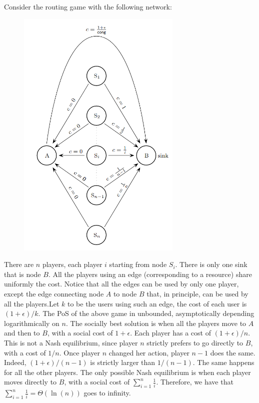Consider the routing game with the following network:
\begin{figure}[H]
\centering
\includegraphics[width=0.7\textwidth]{images/img_3_16_01.png}
\end{figure}
There are $n$ players, each player $i$ starting from node $S_i$. There is only one sink that is node $B$. All the players using an edge (corresponding to a resource) share uniformly the cost. Notice that all the edges can be used by only one player, except the edge connecting node $A$ to node $B$ that, in principle, can be used by all the players.Let $k$ to be the users using such an edge, the cost of each user is $(1 + \epsilon)/k$. The PoS of the above game in unbounded, asymptotically depending logarithmically on $n$. The socially best solution is when all the players move to $A$ and then to $B$, with a social cost of $1+\epsilon$. Each player has a cost of $(1 + \epsilon)/n$. This is not a Nash equilibrium, since player $n$ strictly prefers to go directly to $B$, with a cost of $1/n$. Once player $n$ changed her action, player $n-1$ does the same. Indeed, $(1+\epsilon)/(n-1)$ is strictly larger than $1/(n-1)$. The same happens for all the other players. The only possible Nash equilibrium is when each player moves directly to $B$, with a social cost of $\sum_{i=1}^{n}{\frac{1}{i}}$. Therefore, we have that $\sum_{i=1}^{n}{\frac{1}{i}} = \Theta(\ln (n))$ goes to infinity.\\

